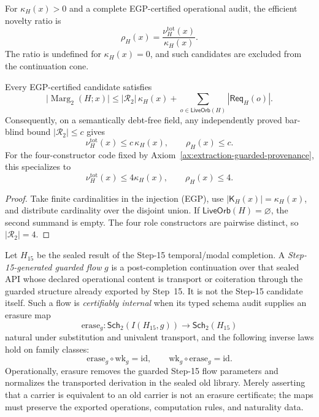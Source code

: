 \begin{definition}
For \(\kappa_H(x)>0\) and a complete EGP-certified operational audit, the
efficient novelty ratio is
\[
\rho_H(x)=\frac{\nu^{\mathrm{tot}}_H(x)}{\kappa_H(x)}.
\]
The ratio is undefined for \(\kappa_H(x)=0\), and such candidates are excluded
from the continuation cone.
\end{definition}

\begin{proposition}
\label{prop:provenance-accounting-bound}
Every EGP-certified candidate satisfies
\[
  \bigl|\operatorname{Marg}_2(H;x)\bigr|
  \le
  |\mathcal R_2|\,\kappa_H(x)
  +
  \sum_{o\in\mathsf{LiveOrb}(H)}|\mathsf{Req}_H(o)|.
  \tag{P}
\]
Consequently, on a semantically debt-free field, any independently proved
bar-blind bound \(|\mathcal R_2|\le c\) gives
\[
  \nu_H^{\mathrm{tot}}(x)\le c\,\kappa_H(x),
  \qquad
  \rho_H(x)\le c.
\]
For the four-constructor code fixed by
Axiom~\ref{ax:extraction-guarded-provenance}, this specializes to
\[
  \nu_H^{\mathrm{tot}}(x)\le4\kappa_H(x),
  \qquad
  \rho_H(x)\le4.
\]
\end{proposition}

\begin{proof}
Take finite cardinalities in the injection (EGP), use
\(|\mathsf K_H(x)|=\kappa_H(x)\), and distribute cardinality over the disjoint
union. If \(\mathsf{LiveOrb}(H)=\varnothing\), the second summand is empty.
The four role constructors are pairwise distinct, so
\(|\mathcal R_2|=4\).
\end{proof}

\begin{definition}
\label{def:guarded-step15-internal-flow}
Let \(H_{15}\) be the sealed result of the Step-15 temporal/modal completion.
A \emph{Step-15-generated guarded flow} \(g\) is a post-completion continuation
over that sealed API whose declared operational content is transport or
coiteration through the guarded structure already exported by Step~15. It is
not the Step-15 candidate itself. Such a flow is \emph{certifiably internal}
when
its typed schema audit supplies an erasure map
\[
  \mathrm{erase}_g:\mathsf{Sch}_2(I(H_{15},g))\longrightarrow
  \mathsf{Sch}_2(H_{15})
\]
natural under substitution and univalent transport, and the following inverse
laws hold on family classes:
\[
  \mathrm{erase}_g\circ\mathrm{wk}_g=\mathrm{id},
  \qquad
  \mathrm{wk}_g\circ\mathrm{erase}_g=\mathrm{id}.
  \tag{WE}
\]
Operationally, erasure removes the guarded Step-15 flow parameters and
normalizes the transported derivation in the sealed old library. Merely
asserting that a carrier is equivalent to an old carrier is not an erasure
certificate; the maps must preserve the exported operations, computation
rules, and naturality data.
\end{definition}

